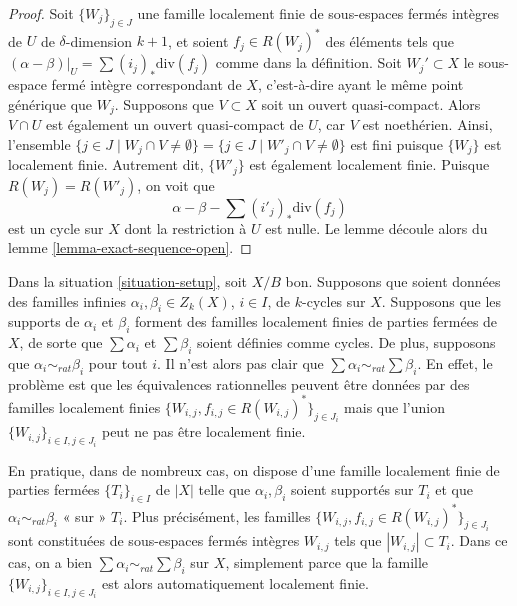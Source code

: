 \begin{proof}
Soit $\{W_j\}_{j \in J}$ une famille localement finie de sous-espaces
fermés intègres de $U$ de $\delta$-dimension $k + 1$, et soient $f_j \in
R(W_j)^*$ des éléments tels que $(\alpha - \beta)|_U = \sum
(i_j)_*\text{div}(f_j)$ comme dans la définition. Soit $W_j' \subset X$ le
sous-espace fermé intègre correspondant de $X$, c'est-à-dire ayant le même
point générique que $W_j$. Supposons que $V \subset X$ soit un ouvert
quasi-compact. Alors $V \cap U$ est également un ouvert quasi-compact de $U$,
car $V$ est noethérien. Ainsi, l'ensemble $\{j \in J \mid W_j \cap V \not =
\emptyset\} = \{j \in J \mid W'_j \cap V \not = \emptyset\}$ est fini puisque
$\{W_j\}$ est localement finie. Autrement dit, $\{W'_j\}$ est également
localement finie. Puisque $R(W_j) = R(W'_j)$, on voit que
$$
\alpha - \beta - \sum (i'_j)_*\text{div}(f_j)
$$
est un cycle sur $X$ dont la restriction à $U$ est nulle. Le lemme découle
alors du lemme \ref{lemma-exact-sequence-open}.
\end{proof}

\begin{remark}
\label{remark-infinite-sums-rational-equivalences}
Dans la situation \ref{situation-setup}, soit $X/B$ bon. Supposons que
soient données des familles infinies $\alpha_i, \beta_i \in Z_k(X)$,
$i \in I$, de $k$-cycles sur $X$. Supposons que les supports de $\alpha_i$ et
$\beta_i$ forment des familles localement finies de parties fermées de $X$, de
sorte que $\sum \alpha_i$ et $\sum \beta_i$ soient définies comme cycles. De
plus, supposons que $\alpha_i \sim_{rat} \beta_i$ pour tout $i$. Il n'est alors
pas clair que $\sum \alpha_i \sim_{rat} \sum \beta_i$. En effet, le problème
est que les équivalences rationnelles peuvent être données
par des familles localement finies $\{W_{i, j}, f_{i, j} \in R(W_{i,
j})^*\}_{j \in J_i}$ mais que l'union $\{W_{i, j}\}_{i \in I, j\in J_i}$ peut
ne pas être localement finie.

\medskip\noindent
En pratique, dans de nombreux cas, on dispose d'une famille localement finie de
parties fermées $\{T_i\}_{i \in I}$ de $|X|$ telle que $\alpha_i,
\beta_i$ soient supportés sur $T_i$ et que $\alpha_i \sim_{rat} \beta_i$ «
sur » $T_i$. Plus précisément, les familles $\{W_{i, j}, f_{i, j} \in R(W_{i,
j})^*\}_{j \in J_i}$ sont constituées de sous-espaces fermés intègres $W_{i,
j}$ tels que $|W_{i, j}| \subset T_i$. Dans ce cas, on a bien $\sum \alpha_i
\sim_{rat} \sum \beta_i$ sur $X$, simplement parce que la famille
$\{W_{i, j}\}_{i \in I, j\in J_i}$ est alors automatiquement localement finie.
\end{remark}











